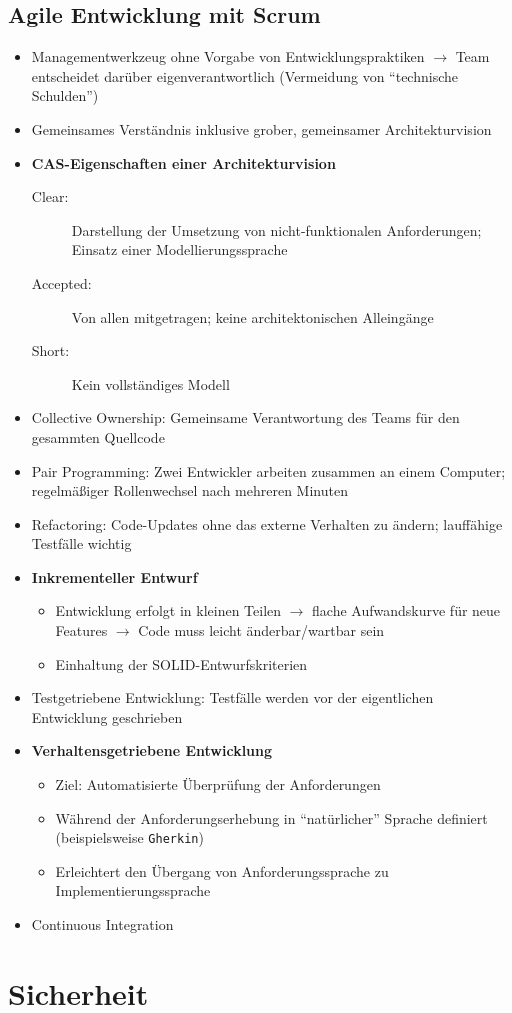 \subsection{Agile Entwicklung mit Scrum}
\begin{itemize}
	\item Managementwerkzeug ohne Vorgabe von Entwicklungspraktiken \(\rightarrow\) Team entscheidet darüber eigenverantwortlich (Vermeidung von "`technische Schulden"')
	\item Gemeinsames Verständnis inklusive grober, gemeinsamer Architekturvision
	\item \textbf{CAS-Eigenschaften einer Architekturvision}
	\begin{description}
		\item[Clear:] Darstellung der Umsetzung von nicht-funktionalen Anforderungen; Einsatz einer Modellierungssprache
		\item[Accepted:] Von allen mitgetragen; keine architektonischen Alleingänge
		\item[Short:] Kein vollständiges Modell
	\end{description}
	\item Collective Ownership: Gemeinsame Verantwortung des Teams für den gesammten Quellcode
	\item Pair Programming: Zwei Entwickler arbeiten zusammen an einem Computer; regelmäßiger Rollenwechsel nach mehreren Minuten
	\item Refactoring: Code-Updates ohne das externe Verhalten zu ändern; lauffähige Testfälle wichtig
	\item \textbf{Inkrementeller Entwurf}
	\begin{itemize}
		\item Entwicklung erfolgt in kleinen Teilen \(\rightarrow\) flache Aufwandskurve für neue Features \(\rightarrow\) Code muss leicht änderbar/wartbar sein
		\item Einhaltung der SOLID-Entwurfskriterien
	\end{itemize}
	\item Testgetriebene Entwicklung: Testfälle werden vor der eigentlichen Entwicklung geschrieben
	\item \textbf{Verhaltensgetriebene Entwicklung}
	\begin{itemize}
		\item Ziel: Automatisierte Überprüfung der Anforderungen
		\item Während der Anforderungserhebung in "`natürlicher"' Sprache definiert (beispielsweise \texttt{Gherkin})
		\item Erleichtert den Übergang von Anforderungssprache zu Implementierungssprache
	\end{itemize}
	\item Continuous Integration
\end{itemize}



\section{Sicherheit}